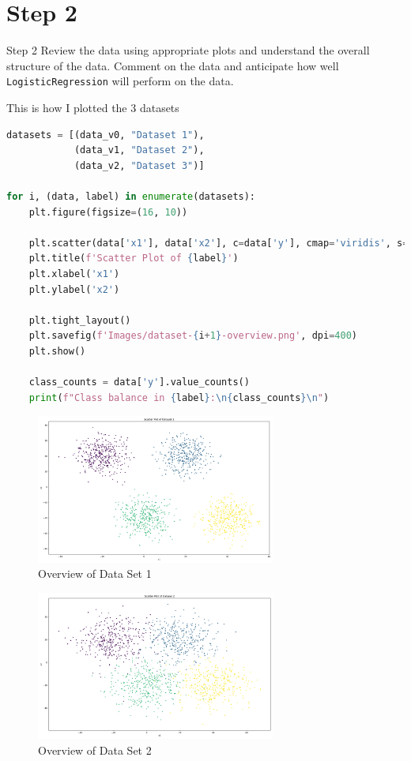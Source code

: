 \section*{Step 2}

\begin{custombox}[label={box:Q2}]{Step 2}
	Review the data using appropriate plots and understand the overall structure of the data. Comment on the data and anticipate how well \texttt{LogisticRegression} will perform on the data.
\end{custombox}

This is how I plotted the 3 datasets

\begin{lstlisting}[language=Python, caption=Plotting the Datasets]
datasets = [(data_v0, "Dataset 1"), 
            (data_v1, "Dataset 2"),
            (data_v2, "Dataset 3")]

for i, (data, label) in enumerate(datasets):
    plt.figure(figsize=(16, 10))
    
    plt.scatter(data['x1'], data['x2'], c=data['y'], cmap='viridis', s=10)
    plt.title(f'Scatter Plot of {label}')
    plt.xlabel('x1')
    plt.ylabel('x2')
    
    plt.tight_layout()
    plt.savefig(f'Images/dataset-{i+1}-overview.png', dpi=400)
    plt.show()
    
    class_counts = data['y'].value_counts()
    print(f"Class balance in {label}:\n{class_counts}\n")
\end{lstlisting}

\begin{figure}[H]
    \centering
    \includegraphics[width=0.7\textwidth]{Images/dataset-1-overview.png}
    \caption{Overview of Data Set 1}
\end{figure}

\begin{figure}[H]
    \centering
    \includegraphics[width=0.7\textwidth]{Images/dataset-2-overview.png}
    \caption{Overview of Data Set 2}
\end{figure}

